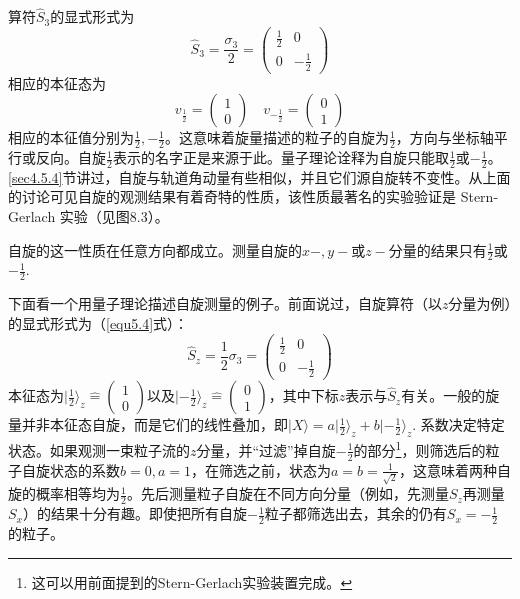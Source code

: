 算符$\hat{S}_3$的显式形式为
\begin{equation}
	\hat{S}_3 = \frac{\sigma_3}{2} =
		\begin{pmatrix}
			\frac{1}{2} & 0 \\
			0 & -\frac{1}{2}
		\end{pmatrix}
\label{equ8.46}
\end{equation}
相应的本征态为
\begin{equation}
	v_{\frac{1}{2}} =
		\begin{pmatrix}
			1 \\ 0
		\end{pmatrix}
	\quad
	v_{-\frac{1}{2}} =
		\begin{pmatrix}
			0 \\ 1
		\end{pmatrix}
\label{equ8.47}
\end{equation}
相应的本征值分别为$\frac{1}{2}, -\frac{1}{2}$。这意味着旋量描述的粒子的自旋为$\frac{1}{2}$，方向与坐标轴平行或反向。自旋$\frac{1}{2}$表示的名字正是来源于此。量子理论诠释为自旋只能取$\frac{1}{2}$或$-\frac{1}{2}$。\ref{sec4.5.4}节讲过，自旋与轨道角动量有些相似，并且它们源自旋转不变性。从上面的讨论可见自旋的观测结果有着奇特的性质，该性质最著名的实验验证是 Stern-Gerlach 实验（见图8.3）。

自旋的这一性质在任意方向都成立。测量自旋的$x-, y-$或$z-$分量的结果只有$\frac{1}{2}$或$-\frac{1}{2}$.

下面看一个用量子理论描述自旋测量的例子。前面说过，自旋算符（以$z$分量为例）的显式形式为（\eqref{equ5.4}式）：
\begin{equation}
\label{equ8.48}
	\hat{S}_z = \frac{1}{2} \sigma_3 =
		\begin{pmatrix}
			\frac{1}{2} & 0 \\
			0 & -\frac{1}{2}
		\end{pmatrix}
\end{equation}
本征态为$|\frac{1}{2}\rangle_z \hat{=} \begin{pmatrix} 1 \\ 0 \end{pmatrix}$以及$|-\frac{1}{2}\rangle_z \hat{=} \begin{pmatrix} 0 \\ 1 \end{pmatrix}$，其中下标$z$表示与$\hat{S}_z$有关。一般的旋量并非本征态自旋，而是它们的线性叠加，即$|X\rangle = a |\frac{1}{2}\rangle_z + b |-\frac{1}{2}\rangle_z$. 系数决定特定状态。如果观测一束粒子流的$z$分量，并“过滤”掉自旋$-\frac{1}{2}$的部分\footnote{这可以用前面提到的Stern-Gerlach实验装置完成。}，则筛选后的粒子自旋状态的系数$b = 0, a = 1$，在筛选之前，状态为$a = b = \frac{1}{\sqrt{2}}$，这意味着两种自旋的概率相等均为$\frac{1}{2}$。先后测量粒子自旋在不同方向分量（例如，先测量$S_z$再测量$S_x$）的结果十分有趣。即使把所有自旋$-\frac{1}{2}$粒子都筛选出去，其余的仍有$S_x = -\frac{1}{2}$的粒子。

